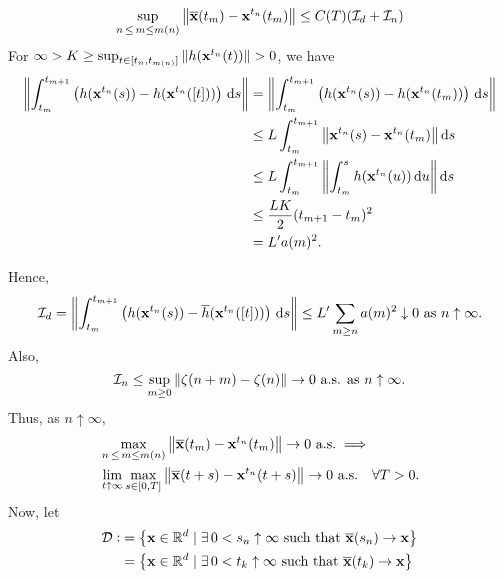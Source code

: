 \[
    \sup_{n\, \leq\, m \leq m(n)} \norm{\overline{\mathbf{x}}(t_m) - \mathbf{x}^{t_n}(t_m)} \leq C(T)(\mathcal{I}_d + \mathcal{I}_n)
\]
For $\infty > K \geq \sup_{t \in [t_n, t_{m(n)}]} \norm{h(\mathbf{x}^{t_n}(t))} > 0$, we have
\begin{align*}
    \norm{\int_{t_m}^{t_{m+1}} \left( h(\mathbf{x}^{t_n}(s)) - h(\mathbf{x}^{t_n}([t])) \right) \, \mathrm{d} s} &= \norm{\int_{t_m}^{t_{m+1}} \left( h(\mathbf{x}^{t_n}(s)) - h(\mathbf{x}^{t_n}(t_m)) \right) \, \mathrm{d} s} \\
    &\leq L \int_{t_m}^{t_{m+1}} \norm{ \mathbf{x}^{t_n}(s) - \mathbf{x}^{t_n}(t_m) } \, \mathrm{d} s \\
    &\leq L \int_{t_m}^{t_{m+1}} \norm{ \int_{t_m}^s h(\mathbf{x}^{t_n}(u)) \, \mathrm{d} u } \, \mathrm{d} s  \\
    &\leq \frac{LK}{2} (t_{m+1} - t_m)^2 \\
    &= L^{\prime} a(m)^2.
\end{align*}

Hence, 
\[
    \mathcal{I}_d = \norm{\int_{t_m}^{t_{m+1}} \left( h(\mathbf{x}^{t_n}(s)) - \overline{h}(\mathbf{x}^{t_n}([t])) \right) \, \mathrm{d} s} 
    \leq L^{\prime} \sum_{m \geq n} a(m)^2 \downarrow 0 \text{ as } n \uparrow \infty.
\]
Also, 
\[
    \mathcal{I}_n \leq \sup_{m \geq 0} \norm{\zeta(n+m) - \zeta(n)} \to 0 \text{ a.s. as } n \uparrow \infty.
\]
Thus, as $n \uparrow \infty$, 
\begin{align*}
    &\max_{n\, \leq\, m \leq m(n)} \norm{\overline{\mathbf{x}}(t_m) - \mathbf{x}^{t_n}(t_m)} \to 0 \text{ a.s.} \implies \\
    &\lim_{t \uparrow \infty} \max_{s \in [0,T]} \norm{\overline{\mathbf{x}}(t+s) - \mathbf{x}^{t_n}(t+s)} \to 0 \text{ a.s.} \quad \forall T > 0.
\end{align*}
Now, let
\begin{align*}
    \mathcal{D} \vcentcolon&= \left\{ \mathbf{x} \in \mathbb{R}^d \mid \exists \, 0 < s_n \uparrow \infty \text{ such that } \overline{\mathbf{x}}(s_n) \to \mathbf{x} \right\} \\
    &=\left\{ \mathbf{x} \in \mathbb{R}^d \mid \exists \, 0 < t_k \uparrow \infty \text{ such that } \overline{\mathbf{x}}(t_k) \to \mathbf{x} \right\}
\end{align*}

